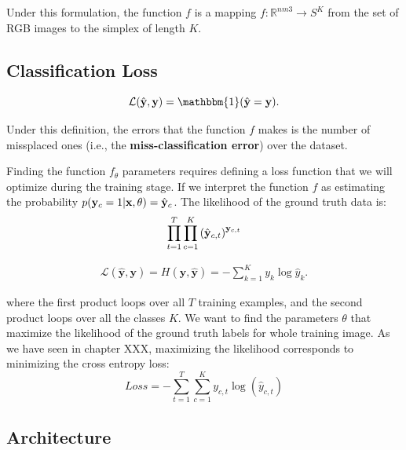 Under this formulation, the function $f$ is a mapping $f:\mathbb{R}^{nm3} \rightarrow S^K$ from the set of RGB images to the simplex of length $K$.


\subsection{Classification Loss}


\begin{equation}
	\mathcal{L}(\hat{\mathbf{y}},\mathbf{y}) = \mathbbm{1}(\hat{\mathbf{y}}=\mathbf{y}).
\end{equation}


Under this definition, the errors that the function $f$ makes is the number of missplaced ones (i.e., the {\bf miss-classification error}) over the dataset.

Finding the function $f_\theta$ parameters requires defining a loss function that we will optimize during the training stage.
If we interpret the function $f$ as estimating the probability $p({\bf y}_c=1 | {\bf x}, \theta) = \hat {\bf y}_c$. The likelihood of the ground truth data is:
\begin{equation}
	\prod_{t=1}^T \prod_{c=1}^K \left( \hat {\bf y}_{c,t} \right) ^{{\bf y}_{c,t}}
\end{equation}

\begin{align}
	\mathcal{L}(\hat{\mathbf{y}},\mathbf{y}) = H(\mathbf{y}, \hat{\mathbf{y}}) = - \sum_{k=1}^K y_k \log \hat{y}_k.
\end{align}

where the first product loops over all $T$ training examples, and the second product loops over all the classes $K$. We want to find the parameters $\theta$ that maximize the likelihood of the ground truth labels for whole training image. As we have seen in chapter XXX, maximizing the likelihood corresponds to minimizing the cross entropy loss:
\begin{equation}
	Loss = - \sum_{t=1}^{T} \sum_{c=1}^{K} y_{c,t} \log (\hat y_{c,t})
\end{equation}


\subsection{Architecture}

